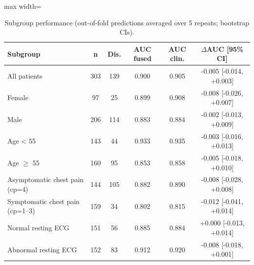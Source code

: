 \begin{table}[!t]
\centering
\scriptsize
\caption{Subgroup performance (out-of-fold predictions averaged over 5 repeats; bootstrap CIs).}
\label{tab:subgroups}
\setlength{\tabcolsep}{3pt}
\begin{adjustbox}{max width=\linewidth}
\begin{tabular}{lccccc}
\toprule
Subgroup & n & Dis. & AUC fused & AUC clin. & $\Delta$AUC [95\% CI] \\
\midrule
All patients & 303 & 139 & 0.900 & 0.905 & -0.005 [-0.014, +0.003] \\
Female & 97 & 25 & 0.899 & 0.908 & -0.008 [-0.026, +0.007] \\
Male & 206 & 114 & 0.883 & 0.884 & -0.002 [-0.013, +0.009] \\
Age < 55 & 143 & 44 & 0.933 & 0.935 & -0.003 [-0.016, +0.013] \\
Age $\geq$ 55 & 160 & 95 & 0.853 & 0.858 & -0.005 [-0.018, +0.010] \\
Asymptomatic chest pain (cp=4) & 144 & 105 & 0.882 & 0.890 & -0.008 [-0.028, +0.008] \\
Symptomatic chest pain (cp=1--3) & 159 & 34 & 0.802 & 0.815 & -0.012 [-0.041, +0.014] \\
Normal resting ECG & 151 & 56 & 0.885 & 0.884 & +0.000 [-0.013, +0.014] \\
Abnormal resting ECG & 152 & 83 & 0.912 & 0.920 & -0.008 [-0.018, +0.001] \\
\bottomrule
\end{tabular}
\end{adjustbox}
\end{table}
